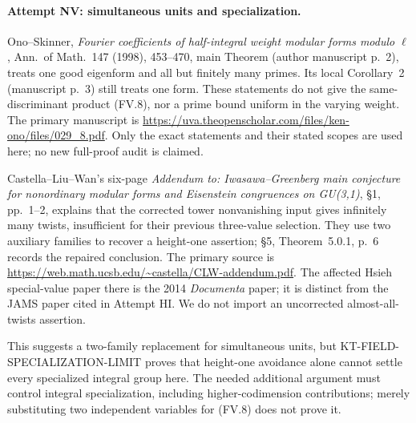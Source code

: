\paragraph{Attempt NV: simultaneous units and specialization.}
Ono--Skinner, \emph{Fourier coefficients of half-integral weight
modular forms modulo $\ell$}, Ann.\ of Math.\ 147 (1998),
453--470, main Theorem (author manuscript p.~2), treats one
good eigenform and all but finitely many primes. Its local
Corollary~2 (manuscript p.~3) still treats one form. These
statements do not give the same-discriminant product (FV.8),
nor a prime bound uniform in the varying weight. The primary
manuscript is
\url{https://uva.theopenscholar.com/files/ken-ono/files/029_8.pdf}.
Only the exact statements and their stated scopes are used here;
no new full-proof audit is claimed.

Castella--Liu--Wan's six-page \emph{Addendum to: Iwasawa--Greenberg
main conjecture for nonordinary modular forms and Eisenstein
congruences on GU(3,1)}, \S1, pp.~1--2, explains that the corrected
tower nonvanishing input gives infinitely many twists, insufficient
for their previous three-value selection. They use two auxiliary
families to recover a height-one assertion; \S5, Theorem~5.0.1,
p.~6 records the repaired conclusion. The primary source is
\url{https://web.math.ucsb.edu/~castella/CLW-addendum.pdf}.
The affected Hsieh special-value paper there is the 2014
\emph{Documenta} paper; it is distinct from the JAMS paper
cited in Attempt HI. We do not import an uncorrected
almost-all-twists assertion.

This suggests a two-family replacement for simultaneous units,
but KT-FIELD-SPECIALIZATION-LIMIT proves that height-one avoidance
alone cannot settle every specialized integral group here.
The needed additional argument must control integral specialization,
including higher-codimension contributions; merely substituting
two independent variables for (FV.8) does not prove it.
